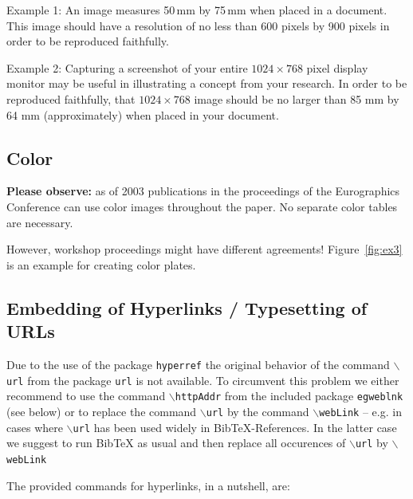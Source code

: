 \documentclass{egpubl}
\begin{document}
Example 1: 
%
An image measures 50\,mm by 75\,mm when placed in a document. This
image should have a resolution of no less than 600 pixels by 900
pixels in order to be reproduced faithfully.

Example 2: 
%
Capturing a screenshot of your entire $1024 \times 768$ pixel display
monitor may be useful in illustrating a concept from your research. In
order to be reproduced faithfully, that $1024 \times 768$ image should
be no larger than 85 mm by 64 mm (approximately) when placed in your
document.


\subsection{Color}

\textbf{Please observe:} as of 2003 publications in the proceedings of the
Eurographics Conference can use color images throughout the paper. No
separate color tables are necessary.

However, workshop proceedings might have different agreements! 
Figure~\ref{fig:ex3} is an example for creating color plates.

\subsection{Embedding of Hyperlinks / Typesetting of URLs}

Due to the use of the package \texttt{hyperref} the original behavior
of the command $\backslash$\texttt{url} from the package \texttt{url}
is not available. To circumvent this problem we either recommend to
use the command $\backslash$\texttt{httpAddr} from the 
included package \texttt{egweblnk} (see below) or to replace the
command $\backslash$\texttt{url} by the command $\backslash$\texttt{webLink} 
-- e.g. in cases where $\backslash$\texttt{url} has been used
widely in BibTeX-References. In the latter case we suggest to run
BibTeX as usual and then replace all occurences of $\backslash$\texttt{url}  by
$\backslash$\texttt{webLink}

\noindent
The provided commands for hyperlinks, in a nutshell, are:
\end{document}
